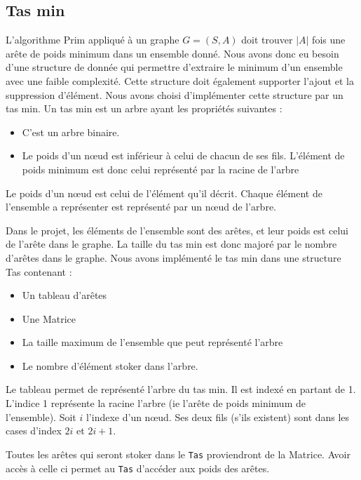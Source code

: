 \documentclass[a4paper,11pt]{article}
\begin{document}
\subsection{Tas min} %
L'algorithme Prim appliqué à un graphe $G = (S, A)$ doit trouver $|A|$ fois une arête de poids minimum dans un ensemble donné.
Nous avons donc eu besoin d'une structure de donnée qui permettre d'extraire le minimum d'un ensemble avec une faible complexité. Cette structure doit également supporter l'ajout et la suppression d'élément.
Nous avons choisi d’implémenter cette structure par un tas min.
Un tas min est un arbre ayant les propriétés suivantes :
\begin{itemize}
\item C'est un arbre binaire.
\item Le poids d'un nœud est inférieur à celui de chacun de ses fils. L'élément de poids minimum est donc celui représenté par la racine de l'arbre
\end{itemize}
Le poids d'un nœud est celui de l'élément qu'il décrit.
Chaque élément de l'ensemble a représenter est représenté par un nœud de l'arbre.

Dans le projet, les éléments de l'ensemble sont des arêtes, et leur poids est celui de l’arête dans le graphe. La taille du tas min est donc majoré par le nombre d’arêtes dans le graphe.
Nous avons implémenté le tas min dans une structure \textsf{Tas} contenant :
\begin{itemize}
\item Un tableau d’arêtes
\item Une Matrice
\item La taille maximum de l'ensemble que peut représenté l'arbre
\item Le nombre d'élément stoker dans l'arbre.
\end{itemize}
Le tableau permet de représenté l'arbre du tas min. Il est indexé en partant de 1.
L'indice 1 représente la racine l'arbre (ie l’arête de poids minimum de l'ensemble).
Soit $i$ l'indexe d'un nœud. Ses deux fils (s'ils existent) sont dans les cases d'index $2i$ et $2i +1$.

Toutes les arêtes qui seront stoker dans le \texttt{Tas} proviendront de la Matrice. Avoir accès à celle ci permet au \texttt{Tas} d'accéder aux poids des arêtes.
\end{document}
